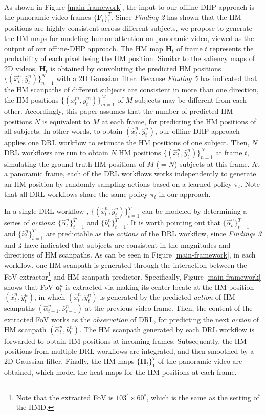 \documentclass[10pt,journal,compsoc]{IEEEtran}
\begin{document}
As shown in Figure \ref{main-framework}, the input to our offline-DHP approach is the panoramic video frames $\{\mathbf{F}_t\}_1^{T}$.
Since \textit{Finding 2} has shown that the HM positions are highly consistent across different subjects,  we propose to generate the HM maps for modeling human attention on panoramic video, viewed as the output of our offline-DHP approach. The HM map $\mathbf{H}_t$ of frame $t$ represents the probability of each pixel being the HM position.
Similar to the saliency maps of 2D videos, $\mathbf{H}_t$ is obtained by convoluting the predicted HM positions $\{(\hat{x}^n_t, \hat{y}^n_t)\}_{n=1}^{N}$ with a 2D Gaussian filter.
Because \textit{Finding 5} has indicated that the HM scanpaths of different subjects are consistent in more than one direction, the HM positions $\{({x}^m_t, {y}^m_t)\}_{m=1}^{M}$ of $M$ subjects may be different from each other. Accordingly, this paper assumes that the number of predicted HM positions $N$ is equivalent to $M$ at each frame, for predicting the HM positions of all subjects.
In other words, to obtain $(\hat{x}^n_t, \hat{y}^n_t)$, our offline-DHP approach applies one DRL workflow to estimate the HM positions of one subject.
Then, $N$ DRL workflows are run to obtain $N$ HM positions $\{(\hat{x}^n_t, \hat{y}^n_t)\}_{n=1}^{N}$ at frame $t$, simulating the ground-truth HM positions of $M$ ($=N$) subjects at this frame.
At a panoramic frame, each of the DRL workflows works independently to generate an HM position by randomly sampling actions based on a learned policy $\pi_t$.
Note that all DRL workflows share the same policy $\pi_t$ in our approach.

In a single DRL workflow , $\{(\hat{x}^n_t, \hat{y}^n_t)\}_{t=1}^T$ can be modeled by determining a series of \textit{actions}: $\{\hat{\alpha}^n_t\}_{t=1}^T$ and $\{\hat{\nu}^n_t\}_{t=1}^T$.
It is worth pointing out that $\{\hat{\alpha}^n_t\}_{t=1}^{T}$ and $\{\hat{\nu}^n_t\}_{t=1}^{T}$ are predictable as the \textit{actions} of the DRL workflow, since \textit{Findings 3} and \textit{4} have indicated that subjects are consistent in the magnitudes and directions of HM scanpaths.
As can be seen in Figure \ref{main-framework}, in each workflow, one HM scanpath is generated through the interaction between the FoV extractor\footnote{Note that the extracted FoV is $103^{\circ} \times 60^{\circ}$, which is the same as the setting of the HMD.} and HM scanpath predictor.
Specifically, Figure \ref{main-framework} shows that FoV $\mathbf{o}^n_t$ is extracted via making its center locate at the HM position $(\hat{x}^n_t,\hat{y}^n_t)$, in which $(\hat{x}^n_t,\hat{y}^n_t)$ is generated by the predicted \textit{action} of HM scanpaths $(\hat{\alpha}^n_{t-1},\hat{\nu}^n_{t-1})$ at the previous video frame.
Then, the content of the extracted FoV works as the \textit{observation} of DRL, for predicting the next \textit{action} of HM scanpath $(\hat{\alpha}^n_{t},\hat{\nu}^n_{t})$.
The HM scanpath generated by each DRL workflow is forwarded to obtain HM positions at incoming frames.
Subsequently, the HM positions from multiple DRL workflows are integrated, and then smoothed by a 2D Gaussian filter.
Finally, the HM maps $\{\mathbf{H}_t\}_1^{T}$ of the panoramic video are obtained, which model the heat maps for the HM positions at each frame.
\end{document}

